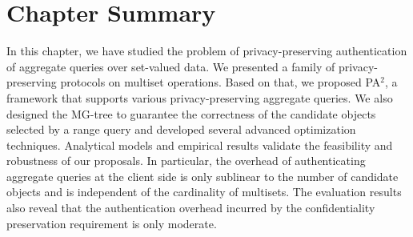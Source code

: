\section{Chapter Summary}\label{sec:aggregate-queries:summary}
In this chapter, we have studied the problem of privacy-preserving authentication of aggregate queries over set-valued data. We presented a family of privacy-preserving protocols on multiset operations. Based on that, we proposed PA$^2$, a framework that supports various privacy-preserving aggregate queries. We also designed the MG-tree to guarantee the correctness of the candidate objects selected by a range query and developed several advanced optimization techniques. Analytical models and empirical results validate the feasibility and robustness of our proposals. In particular, the overhead of authenticating aggregate queries at the client side is only sublinear to the number of candidate objects and is independent of the cardinality of multisets. The evaluation results also reveal that the authentication overhead incurred by the confidentiality preservation requirement is only moderate.
